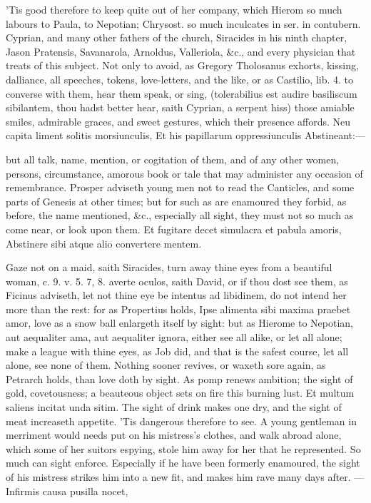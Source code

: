 {'Tis good therefore to keep quite out of her company, which Hierom so
much labours to Paula, to Nepotian; Chrysost. so much inculcates in
ser. in contubern. Cyprian, and many other fathers of the church,
Siracides in his ninth chapter, Jason Pratensis, Savanarola, Arnoldus,
Valleriola, \&c., and every physician that treats of this subject. Not
only to avoid, as  Gregory Tholosanus exhorts, kissing,
dalliance, all speeches, tokens, love-letters, and the like, or as
Castilio, lib. 4. to converse with them, hear them speak, or sing,
(tolerabilius est audire basiliscum sibilantem, thou hadst better hear,
saith Cyprian, a serpent hiss) those amiable smiles,
admirable graces, and sweet gestures, which their presence affords.
Neu capita liment solitis morsiunculis,
Et his papillarum oppressiunculis
Abstineant:---

but all talk, name, mention, or cogitation of them, and of any other
women, persons, circumstance, amorous book or tale that may administer
any occasion of remembrance. Prosper adviseth young men not to
read the Canticles, and some parts of Genesis at other times; but for
such as are enamoured they forbid, as before, the name mentioned, \&c.,
especially all sight, they must not so much as come near, or look upon
them.
Et fugitare decet simulacra et pabula amoris,
Abstinere sibi atque alio convertere mentem.

Gaze not on a maid, saith Siracides, turn away thine eyes from a
beautiful woman, c. 9. v. 5. 7, 8. averte oculos, saith David, or if
thou dost see them, as Ficinus adviseth, let not thine eye be intentus
ad libidinem, do not intend her more than the rest: for as
Propertius holds, Ipse alimenta sibi maxima praebet amor, love as
a snow ball enlargeth itself by sight: but as Hierome to Nepotian, aut
aequaliter ama, aut aequaliter ignora, either see all alike, or let all
alone; make a league with thine eyes, as Job did, and that is the
safest course, let all alone, see none of them. Nothing sooner revives,
or waxeth sore again, as Petrarch holds, than love doth by sight.
As pomp renews ambition; the sight of gold, covetousness; a beauteous
object sets on fire this burning lust. Et multum saliens incitat unda
sitim. The sight of drink makes one dry, and the sight of meat
increaseth appetite. 'Tis dangerous therefore to see. A young
gentleman in merriment would needs put on his mistress's clothes, and
walk abroad alone, which some of her suitors espying, stole him away
for her that he represented. So much can sight enforce. Especially if
he have been formerly enamoured, the sight of his mistress strikes him
into a new fit, and makes him rave many days after.
---Infirmis causa pusilla nocet,

}
